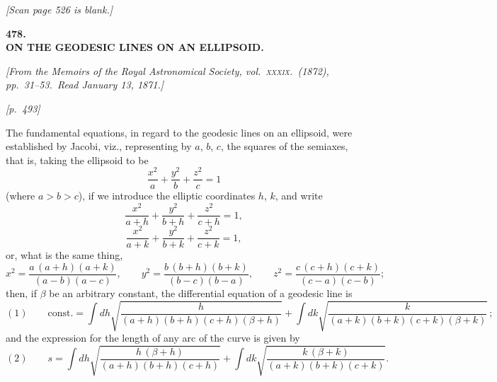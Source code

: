 \documentclass[11pt]{article}
\begin{document}

\begin{center}
\textit{[Scan page 526 is blank.]}
\end{center}

\vspace{1em}

\begin{center}
\textbf{\large 478.}\\[6pt]
\textbf{\Large ON THE GEODESIC LINES ON AN ELLIPSOID.}
\end{center}

\medskip

\noindent\textit{[From the Memoirs of the Royal Astronomical Society, vol.~\textsc{xxxix}.\
(1872), pp.~31--53.\ Read January 13, 1871.]}

\bigskip

\noindent\textit{[p.~493]}

\medskip

The fundamental equations, in regard to the geodesic lines on an ellipsoid, were
established by Jacobi, viz., representing by $a$, $b$, $c$, the squares of the
semiaxes, that is, taking the ellipsoid to be
\[
\frac{x^{2}}{a}+\frac{y^{2}}{b}+\frac{z^{2}}{c}=1
\]
(where $a>b>c$), if we introduce the elliptic coordinates $h$, $k$, and write
\[
\frac{x^{2}}{a+h}+\frac{y^{2}}{b+h}+\frac{z^{2}}{c+h}=1,
\]
\[
\frac{x^{2}}{a+k}+\frac{y^{2}}{b+k}+\frac{z^{2}}{c+k}=1,
\]
or, what is the same thing,
\[
x^{2}=\frac{a\,(a+h)(a+k)}{(a-b)(a-c)},\qquad
y^{2}=\frac{b\,(b+h)(b+k)}{(b-c)(b-a)},\qquad
z^{2}=\frac{c\,(c+h)(c+k)}{(c-a)(c-b)};
\]
then, if $\beta$ be an arbitrary constant, the differential equation of a
geodesic line is
\[
(1)\qquad \mathrm{const.}=\int dh\sqrt{\frac{h}{(a+h)(b+h)(c+h)(\beta+h)}}
+\int dk\sqrt{\frac{k}{(a+k)(b+k)(c+k)(\beta+k)}}\,;
\]
and the expression for the length of any arc of the curve is given by
\[
(2)\qquad s=\int dh\sqrt{\frac{h\,(\beta+h)}{(a+h)(b+h)(c+h)}}
+\int dk\sqrt{\frac{k\,(\beta+k)}{(a+k)(b+k)(c+k)}}.
\]
\end{document}
